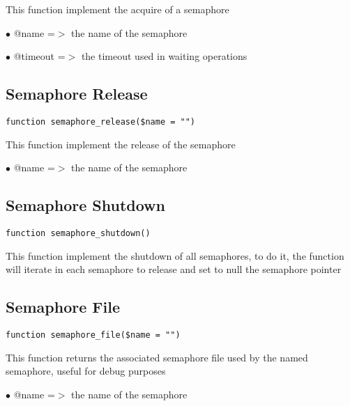 \documentclass[a4paper]{book}
\begin{document}
This function implement the acquire of a semaphore

\begin{compactitem}
\item[\color{myblue}$\bullet$] @name    =$>$ the name of the semaphore
\item[\color{myblue}$\bullet$] @timeout =$>$ the timeout used in waiting operations
\end{compactitem}

\hypertarget{toc218}{}
\subsection{Semaphore Release}

\begin{lstlisting}
function semaphore_release($name = "")
\end{lstlisting}

This function implement the release of the semaphore

\begin{compactitem}
\item[\color{myblue}$\bullet$] @name =$>$ the name of the semaphore
\end{compactitem}

\hypertarget{toc219}{}
\subsection{Semaphore Shutdown}

\begin{lstlisting}
function semaphore_shutdown()
\end{lstlisting}

This function implement the shutdown of all semaphores, to do it,
the function will iterate in each semaphore to release and set to
null the semaphore pointer

\hypertarget{toc220}{}
\subsection{Semaphore File}

\begin{lstlisting}
function semaphore_file($name = "")
\end{lstlisting}

This function returns the associated semaphore file used by the
named semaphore, useful for debug purposes

\begin{compactitem}
\item[\color{myblue}$\bullet$] @name =$>$ the name of the semaphore
\end{compactitem}
\end{document}
